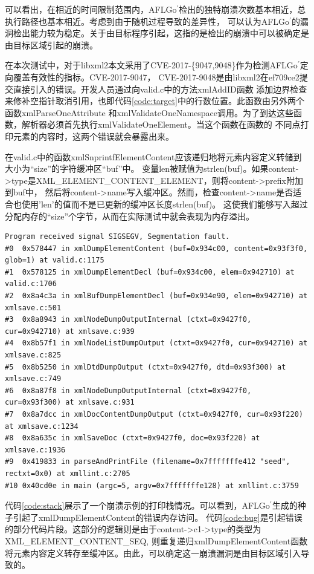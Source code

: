 \documentclass[bachelor]{njupthesis}
\begin{document}
可以看出，在相近的时间限制范围内，AFLGo$^\prime$检出的独特崩溃次数基本相近，总执行路径也基本相近。考虑到由于随机过程导致的差异性，
可以认为AFLGo$^\prime$的漏洞检出能力较为稳定。关于由目标程序引起，这指的是检出的崩溃中可以被确定是由目标区域引起的崩溃。

在本次测试中，对于libxml2本文采用了CVE-2017-\{9047,9048\}作为检测AFLGo$^\prime$定向覆盖有效性的指标。CVE-2017-9047\cite{47CVE}，
CVE-2017-9048\cite{48CVE}是由libxml2在ef709ce2提交直接引入的错误。开发人员通过向valid.c中的方法xmlAddID函数
添加边界检查来修补空指针取消引用，也即代码\ref{code:target}中的行数位置。此函数由另外两个函数xmlParseOneAttribute
和xmlValidateOneNamespace调用。为了到达这些函数，解析器必须首先执行xmlValidateOneElement。当这个函数在函数的
不同点打印元素的内容时，这两个错误就会暴露出来。

在valid.c中的函数xmlSnprintfElementContent应该递归地将元素内容定义转储到大小为“size”的字符缓冲区“buf”中。
变量len被赋值为strlen(buf)。如果content->type是XML\_ELEMENT\_CONTENT\_ELEMENT，则将content->prefix附加到buf中，
然后将content->name写入缓冲区。然而，检查content->name是否适合也使用'len'的值而不是已更新的缓冲区长度strlen(buf)。
这使我们能够写入超过分配内存的“size”个字节，从而在实际测试中就会表现为内存溢出。

\renewcommand{\thelstlisting}{5.\arabic{lstlisting}}
\begin{lstlisting}[caption={示例错误打印栈},label={code:stack},basicstyle=\linespread{1.75}\fontsize{6.8}{5}\ttfamily]
Program received signal SIGSEGV, Segmentation fault.
#0  0x578447 in xmlDumpElementContent (buf=0x934c00, content=0x93f3f0, glob=1) at valid.c:1175
#1  0x578125 in xmlDumpElementDecl (buf=0x934c00, elem=0x942710) at valid.c:1706
#2  0x8a4c3a in xmlBufDumpElementDecl (buf=0x934e90, elem=0x942710) at xmlsave.c:501
#3  0x8a8943 in xmlNodeDumpOutputInternal (ctxt=0x9427f0, cur=0x942710) at xmlsave.c:939
#4  0x8b57f1 in xmlNodeListDumpOutput (ctxt=0x9427f0, cur=0x942710) at xmlsave.c:825
#5  0x8b5250 in xmlDtdDumpOutput (ctxt=0x9427f0, dtd=0x93f300) at xmlsave.c:749
#6  0x8a87f8 in xmlNodeDumpOutputInternal (ctxt=0x9427f0, cur=0x93f300) at xmlsave.c:931
#7  0x8a7dcc in xmlDocContentDumpOutput (ctxt=0x9427f0, cur=0x93f220) at xmlsave.c:1234
#8  0x8a635c in xmlSaveDoc (ctxt=0x9427f0, doc=0x93f220) at xmlsave.c:1936
#9  0x419833 in parseAndPrintFile (filename=0x7fffffffe412 "seed", rectxt=0x0) at xmllint.c:2705
#10 0x40cd0e in main (argc=5, argv=0x7fffffffe128) at xmllint.c:3759
\end{lstlisting}

代码\ref{code:stack}展示了一个崩溃示例的打印栈情况。可以看到，AFLGo$^\prime$生成的种子引起了xmlDumpElementContent的错误内存访问。
代码\ref{code:bug}是引起错误的部分代码片段。这部分的逻辑则是由于content->c1->type的类型为XML\_ELEMENT\_CONTENT\_SEQ,
则重复递归xmlDumpElementContent函数将元素内容定义转存至缓冲区。由此，可以确定这一崩溃漏洞是由目标区域引入导致的。
\end{document}
